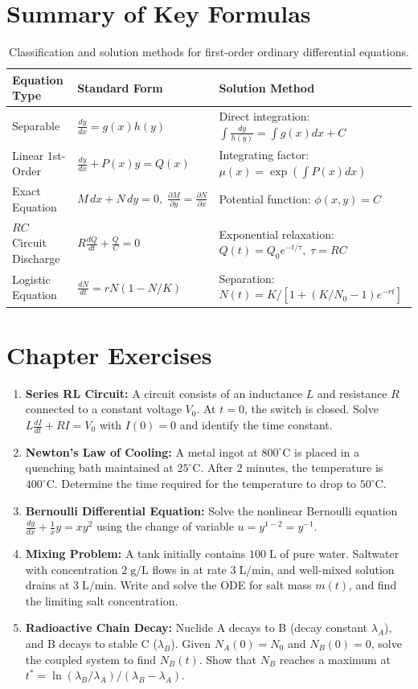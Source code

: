 \section{Summary of Key Formulas}
\begin{table}[H]
\centering
\small
\begin{tabularx}{\textwidth}{llX}
\toprule
\textbf{Equation Type} & \textbf{Standard Form} & \textbf{Solution Method} \\
\midrule
Separable & $\frac{dy}{dx} = g(x)h(y)$ & Direct integration: $\int \frac{dy}{h(y)} = \int g(x)dx + C$ \\
Linear 1st-Order & $\frac{dy}{dx} + P(x)y = Q(x)$ & Integrating factor: $\mu(x) = \exp(\int P(x)dx)$ \\
Exact Equation & $M\,dx + N\,dy = 0, \; \frac{\partial M}{\partial y} = \frac{\partial N}{\partial x}$ & Potential function: $\phi(x,y) = C$ \\
$RC$ Circuit Discharge & $R\frac{dQ}{dt} + \frac{Q}{C} = 0$ & Exponential relaxation: $Q(t) = Q_0 e^{-t/\tau}, \; \tau = RC$ \\
Logistic Equation & $\frac{dN}{dt} = rN(1 - N/K)$ & Separation: $N(t) = K/[1 + (K/N_0 - 1)e^{-rt}]$ \\
\bottomrule
\end{tabularx}
\caption{Classification and solution methods for first-order ordinary differential equations.}
\label{tab:ch08_summary}
\end{table}

\section{Chapter Exercises}
\begin{enumerate}
    \item \textbf{Series RL Circuit:} A circuit consists of an inductance $L$ and resistance $R$ connected to a constant voltage $V_0$. At $t = 0$, the switch is closed. Solve $L\frac{dI}{dt} + RI = V_0$ with $I(0) = 0$ and identify the time constant.
    \item \textbf{Newton's Law of Cooling:} A metal ingot at $800^\circ\text{C}$ is placed in a quenching bath maintained at $25^\circ\text{C}$. After $2\text{ minutes}$, the temperature is $400^\circ\text{C}$. Determine the time required for the temperature to drop to $50^\circ\text{C}$.
    \item \textbf{Bernoulli Differential Equation:} Solve the nonlinear Bernoulli equation $\frac{dy}{dx} + \frac{1}{x}y = x y^2$ using the change of variable $u = y^{1-2} = y^{-1}$.
    \item \textbf{Mixing Problem:} A tank initially contains $100\;\text{L}$ of pure water. Saltwater with concentration $2\;\text{g/L}$ flows in at rate $3\;\text{L/min}$, and well-mixed solution drains at $3\;\text{L/min}$. Write and solve the ODE for salt mass $m(t)$, and find the limiting salt concentration.
    \item \textbf{Radioactive Chain Decay:} Nuclide A decays to B (decay constant $\lambda_A$), and B decays to stable C ($\lambda_B$). Given $N_A(0) = N_0$ and $N_B(0) = 0$, solve the coupled system to find $N_B(t)$. Show that $N_B$ reaches a maximum at $t^* = \ln(\lambda_B/\lambda_A)/(\lambda_B - \lambda_A)$.
\end{enumerate}
